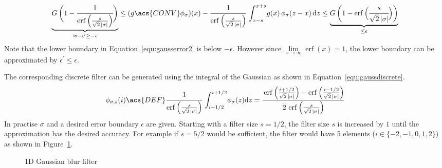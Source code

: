 \documentclass[12pt,a4paper,oneside,openright]{book}
\newcommand{\Eg}{For ex\-am\-ple }
\newcommand{\equ}[1]{Equation~\ref{equ:#1}}
\newcommand{\fig}[1]{Figure~\ref{fig:#1}}
\begin{document}
\begin{CJK}{UTF8}{}
\begin{equation}\label{equ:gausserror2}
  \underbrace{G\,\bigg(1-\cfrac{1}{\operatorname{erf}\Big(\frac{s}{\sqrt{2}\,|\sigma|}\Big)}\bigg)}_{\approx-\epsilon^\prime\ge-\epsilon}\le(g\acs{CONV}\phi_\sigma)(x)-\cfrac{1}{\operatorname{erf}\Big(\frac{s}{\sqrt{2}\,|\sigma|}\Big)}\,\int_{x-s}^{x+s}\! g(x)\,\phi_\sigma(z-x)\,\mathrm{d}z\le\underbrace{G\,\bigg(1-\operatorname{erf}\Big(\cfrac{s}{\sqrt{2}\,|\sigma|}\Big)\bigg)}_{\le\epsilon}
\end{equation}
Note that the lower boundary in \equ{gausserror2} is below $-\epsilon$. However since $\lim\limits_{x\to\infty}\operatorname{erf}(x)=1$, the lower boundary can be approximated by $\epsilon^\prime\le\epsilon$.

The corresponding discrete filter can be generated using the integral of the Gaussian as shown in \equ{gaussdiscrete}.
\begin{equation}\label{equ:gaussdiscrete}
  \phi_{\sigma,s}(i)\acs{DEF}\cfrac{1}{\operatorname{erf}\Big(\frac{s}{\sqrt{2}\,|\sigma|}\Big)}\,\int_{i-1/2}^{i+1/2}\! \phi_\sigma(z)\mathrm{d}z=\cfrac{\operatorname{erf}\Big(\frac{i+1/2}{\sqrt{2}\,|\sigma|}\Big)-\operatorname{erf}\Big(\frac{i-1/2}{\sqrt{2}\,|\sigma|}\Big)}{2\,\operatorname{erf}\Big(\frac{s}{\sqrt{2}\,|\sigma|}\Big)}
\end{equation}
In practise $\sigma$ and a desired error boundary $\epsilon$ are given. Starting with a filter size $s=1/2$, the filter size $s$ is increased by $1$ until the approximation has the desired accuracy. \Eg if $s=5/2$ would be sufficient, the filter would have 5 elements ($i\in\{-2,-1,0,1,2\}$) as shown in \fig{sgauss}.
\begin{figure}[htbp]
  \begin{center}
    \caption{\acs{1D} Gaussian blur filter\label{fig:sgauss}}
  \end{center}
\end{figure}


\end{CJK}
\end{document}
